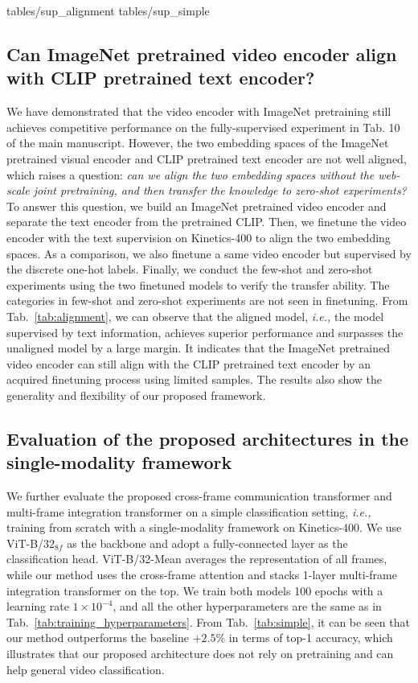 \documentclass[runningheads]{llncs}
\begin{document}
{tables/sup_alignment}
{tables/sup_simple}    

\subsection{Can ImageNet pretrained video encoder align with CLIP pretrained text encoder?}\label{sec:fewshot}
We have demonstrated that the video encoder with ImageNet pretraining still achieves competitive performance on the fully-supervised experiment in Tab. 10 of the main manuscript. However, the two embedding spaces of the ImageNet pretrained visual encoder and CLIP pretrained text encoder are not well aligned, which raises a question: \textit{can we align the two embedding spaces without the web-scale joint pretraining, and then transfer the knowledge to zero-shot experiments?} To answer this question, we build an ImageNet pretrained video encoder and separate the text encoder from the pretrained CLIP. Then, we finetune the video encoder with the text supervision on Kinetics-400 to align the two embedding spaces. As a comparison, we also finetune a same video encoder but supervised by the discrete one-hot labels. Finally, we conduct the few-shot and zero-shot experiments using the two finetuned models to verify the transfer ability. The categories in few-shot and zero-shot experiments are not seen in finetuning. From Tab.~\ref{tab:alignment}, we can observe that the aligned model, \emph{i.e.,} the model supervised by text information, achieves superior performance and surpasses the unaligned model by a large margin. It indicates that the ImageNet pretrained video encoder can still align with the CLIP pretrained text encoder by an acquired finetuning process using limited samples. The results also show the generality and flexibility of our proposed framework.


\subsection{Evaluation of the proposed architectures in the single-modality framework}\label{sec:simple}
We further evaluate the proposed cross-frame communication transformer and multi-frame integration transformer on a simple classification setting, \emph{i.e.,} training from scratch with a single-modality framework on Kinetics-400. We use ViT-B/32$_{8f}$ as the backbone and adopt a fully-connected layer as the classification head. ViT-B/32-Mean averages the representation of all frames, while our method uses the cross-frame attention and stacks 1-layer multi-frame integration transformer on the top. We train both models 100 epochs with a learning rate $1\times10^{-4}$, and all the other hyperparameters are the same as in Tab.~\ref{tab:training_hyperparameters}. From Tab.~\ref{tab:simple}, it can be seen that our method outperforms the baseline $+2.5\%$ in terms of top-1 accuracy, which illustrates that our proposed architecture does not rely on pretraining and can help general video classification.
\end{document}
